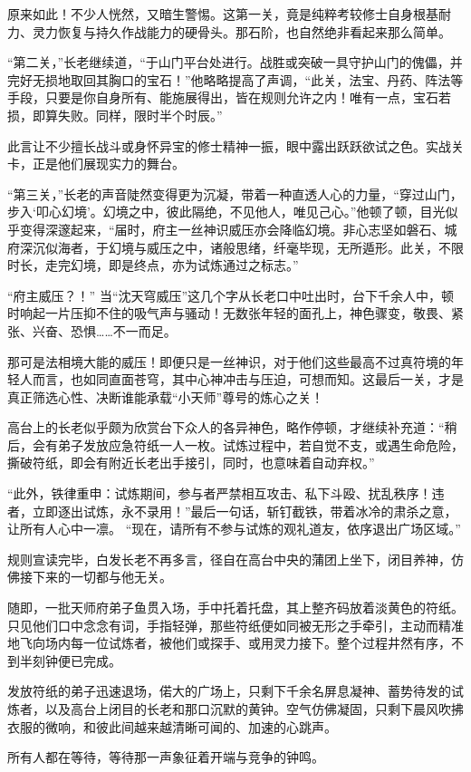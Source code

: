 原来如此！不少人恍然，又暗生警惕。这第一关，竟是纯粹考较修士自身根基耐力、灵力恢复与持久作战能力的硬骨头。那石阶，也自然绝非看起来那么简单。

“第二关，”长老继续道，“于山门平台处进行。战胜或突破一具守护山门的傀儡，并完好无损地取回其胸口的宝石！”他略略提高了声调，“此关，法宝、丹药、阵法等手段，只要是你自身所有、能施展得出，皆在规则允许之内！唯有一点，宝石若损，即算失败。同样，限时半个时辰。”

此言让不少擅长战斗或身怀异宝的修士精神一振，眼中露出跃跃欲试之色。实战关卡，正是他们展现实力的舞台。

“第三关，”长老的声音陡然变得更为沉凝，带着一种直透人心的力量，“穿过山门，步入‘叩心幻境’。幻境之中，彼此隔绝，不见他人，唯见己心。”他顿了顿，目光似乎变得深邃起来，“届时，府主一丝神识威压亦会降临幻境。非心志坚如磐石、城府深沉似海者，于幻境与威压之中，诸般思绪，纤毫毕现，无所遁形。此关，不限时长，走完幻境，即是终点，亦为试炼通过之标志。”

“府主威压？！” 当“沈天穹威压”这几个字从长老口中吐出时，台下千余人中，顿时响起一片压抑不住的吸气声与骚动！无数张年轻的面孔上，神色骤变，敬畏、紧张、兴奋、恐惧……不一而足。

那可是法相境大能的威压！即便只是一丝神识，对于他们这些最高不过真符境的年轻人而言，也如同直面苍穹，其中心神冲击与压迫，可想而知。这最后一关，才是真正筛选心性、决断谁能承载“小天师”尊号的炼心之关！

高台上的长老似乎颇为欣赏台下众人的各异神色，略作停顿，才继续补充道：“稍后，会有弟子发放应急符纸一人一枚。试炼过程中，若自觉不支，或遇生命危险，撕破符纸，即会有附近长老出手接引，同时，也意味着自动弃权。”

“此外，铁律重申：试炼期间，参与者严禁相互攻击、私下斗殴、扰乱秩序！违者，立即逐出试炼，永不录用！”最后一句话，斩钉截铁，带着冰冷的肃杀之意，让所有人心中一凛。 “现在，请所有不参与试炼的观礼道友，依序退出广场区域。”

规则宣读完毕，白发长老不再多言，径自在高台中央的蒲团上坐下，闭目养神，仿佛接下来的一切都与他无关。

随即，一批天师府弟子鱼贯入场，手中托着托盘，其上整齐码放着淡黄色的符纸。只见他们口中念念有词，手指轻弹，那些符纸便如同被无形之手牵引，主动而精准地飞向场内每一位试炼者，被他们或探手、或用灵力接下。整个过程井然有序，不到半刻钟便已完成。

发放符纸的弟子迅速退场，偌大的广场上，只剩下千余名屏息凝神、蓄势待发的试炼者，以及高台上闭目的长老和那口沉默的黄钟。空气仿佛凝固，只剩下晨风吹拂衣服的微响，和彼此间越来越清晰可闻的、加速的心跳声。

所有人都在等待，等待那一声象征着开端与竞争的钟鸣。


